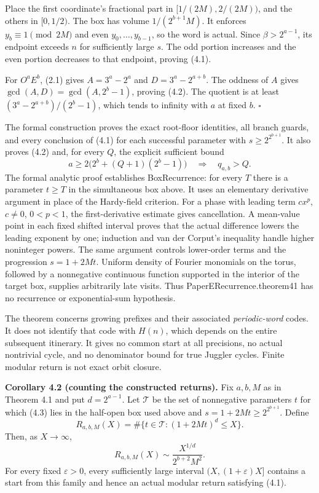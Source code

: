 \documentclass[11pt,a4paper]{article}
\begin{document}
Place the first coordinate's fractional part in \([1/(2M),2/(2M))\), and
the others in \([0,1/2)\). The box has volume \(1/(2^{b+1}M)\). It
enforces \(y_b\equiv1\pmod{2M}\) and even \(y_0,\ldots,y_{b-1}\), so the
word is actual. Since \(\beta>2^{a-1}\), its endpoint exceeds \(n\) for
sufficiently large \(s\). The odd portion increases and the even portion
decreases to that endpoint, proving (4.1).

For \(O^aE^b\), (2.1) gives \(A=3^a-2^a\) and \(D=3^a-2^{a+b}\). The
oddness of \(A\) gives \(\gcd(A,D)=\gcd(A,2^b-1)\), proving (4.2). The
quotient is at least \((3^a-2^{a+b})/(2^b-1)\), which tends to infinity
with \(a\) at fixed \(b\). \(\square\)

The formal construction proves the exact root-floor identities, all
branch guards, and every conclusion of (4.1) for each successful
parameter with \(s\ge2^{2^{b+1}}\). It also proves (4.2) and, for every
\(Q\), the explicit sufficient bound \[
a\ge2\bigl(2^b+(Q+1)(2^b-1)\bigr)\quad\Longrightarrow\quad q_{a,b}>Q.
\] The formal analytic proof establishes BoxRecurrence: for every \(T\)
there is a parameter \(t\ge T\) in the simultaneous box above. It uses
an elementary derivative argument in place of the Hardy-field criterion.
For a phase with leading term \(cx^p\), \(c\ne0\), \(0<p<1\), the
first-derivative estimate gives cancellation. A mean-value point in each
fixed shifted interval proves that the actual difference lowers the
leading exponent by one; induction and van der Corput's inequality
handle higher noninteger powers. The same argument controls lower-order
terms and the progression \(s=1+2Mt\). Uniform density of Fourier
monomials on the torus, followed by a nonnegative continuous function
supported in the interior of the target box, supplies arbitrarily late
visits. Thus PaperERecurrence.theorem41 has no recurrence or
exponential-sum hypothesis.

The theorem concerns growing prefixes and their associated
\emph{periodic-word} codes. It does not identify that code with
\(H(n)\), which depends on the entire subsequent itinerary. It gives no
common start at all precisions, no actual nontrivial cycle, and no
denominator bound for true Juggler cycles. Finite modular return is not
exact orbit closure.

\textbf{Corollary 4.2 (counting the constructed returns).} Fix \(a,b,M\)
as in Theorem 4.1 and put \(d=2^{a-1}\). Let \(\mathcal T\) be the set
of nonnegative parameters \(t\) for which (4.3) lies in the half-open
box used above and \(s=1+2Mt\ge2^{2^{b+1}}\). Define \[
R_{a,b,M}(X)=\#\{t\in\mathcal T:(1+2Mt)^d\le X\}.
\] Then, as \(X\to\infty\), \[
R_{a,b,M}(X)\sim\frac{X^{1/d}}{2^{b+2}M^2}.
\tag{4.4}
\] For every fixed \(\varepsilon>0\), every sufficiently large interval
\((X,(1+\varepsilon)X]\) contains a start from this family and hence an
actual modular return satisfying (4.1).
\end{document}
